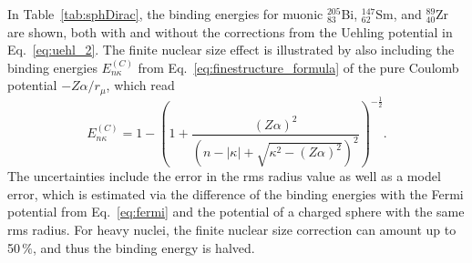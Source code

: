 In Table~\ref{tab:sphDirac}, the binding energies for muonic $^{205}_{83}$Bi, $^{147}_{62}$Sm, and $^{89}_{40}$Zr are shown, both with and without the corrections from the Uehling potential in Eq.~\eqref{eq:uehl_2}. The finite nuclear size effect is illustrated by also including the binding energies $E^{(C)}_{n\kappa}$ from Eq.~\eqref{eq:finestructure_formula} of the pure Coulomb potential $-Z\alpha / r_\mu$, which read~\cite{greiner2000}
\begin{equation}
\label{eq:finestructure_formula_2}
E^{(C)}_{n\kappa}=1-\left(1+\frac{(Z\alpha)^2}{\left( n-|\kappa|+\sqrt{\kappa^2-(Z\alpha)^2} \right)^2}\right)^{-\frac{1}{2}}.
\end{equation}
The uncertainties include the error in the rms radius value as well as a model error, which is estimated via the difference of the binding energies with the Fermi potential from Eq.~\eqref{eq:fermi} and the potential of a charged sphere with the same rms radius. For heavy nuclei, the finite nuclear size correction can amount up to 50$\,\%$, and thus the binding energy is halved.

